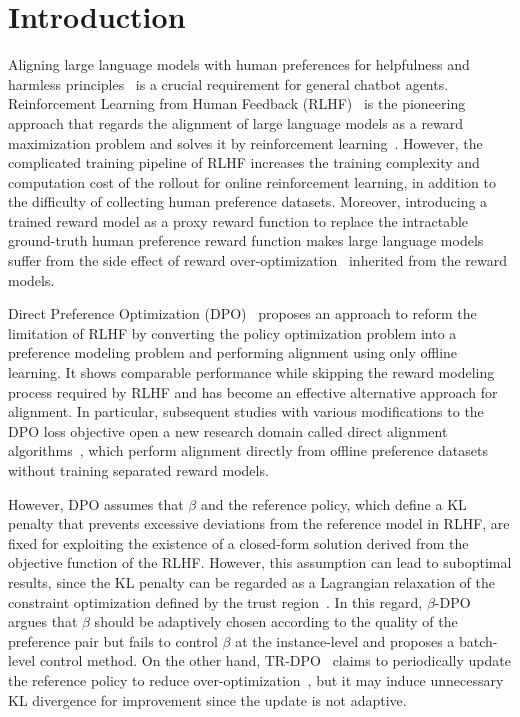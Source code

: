 \section{Introduction}




Aligning large language models with human preferences for helpfulness and harmless principles~\cite{askell2021general, bai2022training, cui2023ultrafeedback} is a crucial requirement for general chatbot agents. Reinforcement Learning from Human Feedback (RLHF)~\cite{ziegler2020finetuning} is the pioneering approach that regards the alignment of large language models as a reward maximization problem and solves it by reinforcement learning~\cite{schulman2017proximal}. However, the complicated training pipeline of RLHF increases the training complexity and computation cost of the rollout for online reinforcement learning, in addition to the difficulty of collecting human preference datasets. Moreover, introducing a trained reward model as a proxy reward function to replace the intractable ground-truth human preference reward function makes large language models suffer from the side effect of reward over-optimization~\cite{gao2023scaling} inherited from the reward models.

Direct Preference Optimization (DPO)~\cite{rafailov2023direct} proposes an approach to reform the limitation of RLHF by converting the policy optimization problem into a preference modeling problem and performing alignment using only offline learning. It shows comparable performance while skipping the reward modeling process required by RLHF and has become an effective alternative approach for alignment. In particular, subsequent studies with various modifications to the DPO loss objective open a new research domain called direct alignment algorithms~\cite{rafailov2024scaling}, which perform alignment directly from offline preference datasets without training separated reward models.

However, DPO assumes that $\beta$ and the reference policy, which define a KL penalty that prevents excessive deviations from the reference model in RLHF, are fixed for exploiting the existence of a closed-form solution derived from the objective function of the RLHF. However, this assumption can lead to suboptimal results, since the KL penalty can be regarded as a Lagrangian relaxation of the constraint optimization defined by the trust region~\cite{schulman2017proximal}. In this regard, $\beta$-DPO~\cite{wu2024beta} argues that $\beta$ should be adaptively chosen according to the quality of the preference pair but fails to control $\beta$ at the instance-level and proposes a batch-level control method. On the other hand, TR-DPO~\cite{gorbatovski2024learn} claims to periodically update the reference policy to reduce over-optimization~\cite{rafailov2024scaling}, but it may induce unnecessary KL divergence for improvement since the update is not adaptive.

